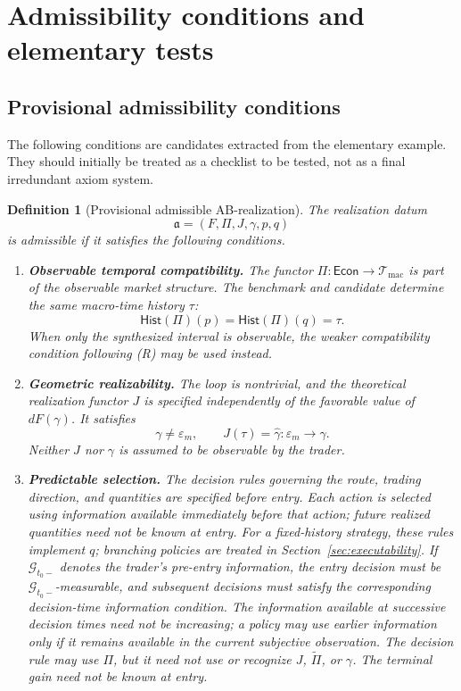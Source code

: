 \documentclass[11pt,a4paper]{article}
\newtheorem{definition}{Definition}[section]
\newcommand{\Econ}{\mathsf{Econ}}
\newcommand{\Hist}{\mathsf{Hist}}
\newcommand{\Tmac}{\mathcal T_{\mathrm{mac}}}
\begin{document}
\section{Admissibility conditions and elementary tests}
\label{sec:admissibility}

\subsection{Provisional admissibility conditions}
\label{sec:admissibilityConditions}

The following conditions are candidates extracted from the elementary
example. They should initially be treated as a checklist to be tested, not as
a final irredundant axiom system.

\begin{definition}[Provisional admissible AB-realization]
The realization datum
\[
  \mathfrak a
  =
  (F,\Pi,J,\gamma,p,q)
\]
is admissible if it satisfies the following conditions.

\begin{enumerate}[label=\textnormal{(A\arabic*)},leftmargin=11mm]
\item \textbf{Observable temporal compatibility.}
The functor \(\Pi:\Econ\to\Tmac\) is part of the observable market
structure.  The benchmark and candidate determine the same macro-time
history \(\tau\):
\[
  \Hist(\Pi)(p)=\Hist(\Pi)(q)=\tau.
\]
When only the synthesized interval is observable, the weaker compatibility
condition following \emph{(R)} may be used instead.

\item \textbf{Geometric realizability.}
The loop is nontrivial, and the theoretical realization functor \(J\) is
specified independently of the favorable value of \(dF(\gamma)\).  It
satisfies
\[
  \gamma\neq\varepsilon_m,
  \qquad
  J(\tau)=\widehat\gamma:
  \varepsilon_m\longrightarrow\gamma.
\]
Neither \(J\) nor \(\gamma\) is assumed to be observable by the trader.

\item \textbf{Predictable selection.}
The decision rules governing the route, trading direction, and quantities
are specified before entry. Each action is selected using information
available immediately before that action; future realized quantities need
not be known at entry. For a fixed-history strategy, these rules implement
\(q\); branching policies are treated in Section~\ref{sec:executability}.  If
\(\mathcal G_{t_0-}\) denotes the trader's pre-entry information, the
entry decision must be \(\mathcal G_{t_0-}\)-measurable, and subsequent
decisions must satisfy the corresponding decision-time information
condition. The information available at successive decision times need not
be increasing; a policy may use earlier information only if it remains
available in the current subjective observation. The decision rule may
use \(\Pi\), but it need not use or recognize \(J\), \(\widetilde\Pi\), or
\(\gamma\).  The terminal gain need not be known at entry.


\end{enumerate}
\end{definition}
\end{document}
